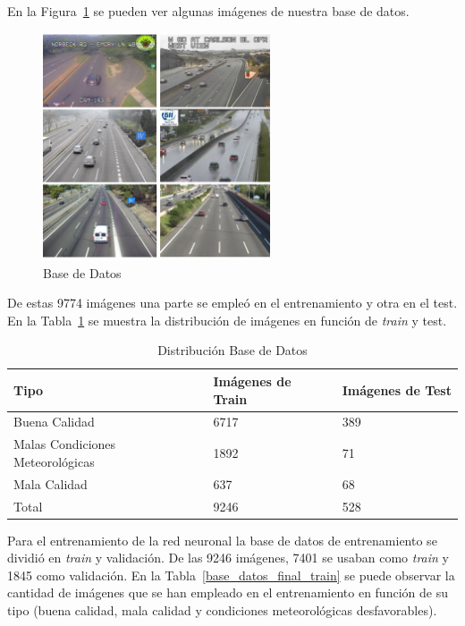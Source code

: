 En la Figura~\ref{fig.base_datos} se pueden ver algunas imágenes de nuestra base de datos.

\begin{figure}[H]
\begin{center}
	\includegraphics[width=0.6\textwidth]{figures/Diseno_global/base_datos.png}
   \caption{Base de Datos}
	\label{fig.base_datos}
\end{center}
\end{figure}

De estas 9774 imágenes una parte se empleó en el entrenamiento y otra en el test. En la Tabla~\ref{tabla_distribucion_base_datos} se muestra la distribución de imágenes en función de \textit{train} y test.

\begin{table}[H] 
\begin{center}
\begin{tabular}{|l|l|l|}
\hline
Tipo & Imágenes de Train & Imágenes de Test  \\ 
\hline \hline
Buena Calidad & 6717 & 389  \\ \hline
Malas Condiciones Meteorológicas & 1892 & 71 \\ \hline
Mala Calidad  & 637 & 68  \\ \hline
Total & 9246 & 528 \\ \hline
\end{tabular}
\caption{Distribución Base de Datos}
\label{tabla_distribucion_base_datos}
\end{center}
\end{table}

Para el entrenamiento de la red neuronal la base de datos de entrenamiento se dividió en \textit{train} y validación. De las 9246 imágenes, 7401 se usaban como \textit{train} y 1845 como validación. En la Tabla~\ref{base_datos_final_train} se puede observar la cantidad de imágenes que se han empleado en el entrenamiento en función de su tipo (buena calidad, mala calidad y condiciones meteorológicas desfavorables).

